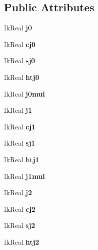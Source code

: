 \subsection*{Public Attributes}
\begin{DoxyCompactItemize}
\item 
Ik\-Real {\bfseries j0}\label{class_i_k_solver_a57f10792b61e342bc910311172b36488}

\item 
Ik\-Real {\bfseries cj0}\label{class_i_k_solver_aa3c0bd74bcf87573ce608d8039408526}

\item 
Ik\-Real {\bfseries sj0}\label{class_i_k_solver_a791e2437d1fc1b568b213b0388f97d0a}

\item 
Ik\-Real {\bfseries htj0}\label{class_i_k_solver_af29aefe604a6957a573f5532a0ae0924}

\item 
Ik\-Real {\bfseries j0mul}\label{class_i_k_solver_a7e5b52eca8716ef85d3e857c5c6a0664}

\item 
Ik\-Real {\bfseries j1}\label{class_i_k_solver_abce606fc49166277524525eadfe47f1a}

\item 
Ik\-Real {\bfseries cj1}\label{class_i_k_solver_a2eff4800151517f5c649cb948bad8326}

\item 
Ik\-Real {\bfseries sj1}\label{class_i_k_solver_a0d7c3270795003a7947ae93ba90b8335}

\item 
Ik\-Real {\bfseries htj1}\label{class_i_k_solver_aa12be6bab85a8ca6c8c74c0cb5e92cf9}

\item 
Ik\-Real {\bfseries j1mul}\label{class_i_k_solver_a8e666ee88199689ecabf3d3457d86bc2}

\item 
Ik\-Real {\bfseries j2}\label{class_i_k_solver_a2059d93255027d204610a6818e5c45a6}

\item 
Ik\-Real {\bfseries cj2}\label{class_i_k_solver_afae239eeaad5f0c027cd4837faa666a0}

\item 
Ik\-Real {\bfseries sj2}\label{class_i_k_solver_adbd68395fd872d5e9a13f3a787c1b0d9}

\item 
Ik\-Real {\bfseries htj2}\label{class_i_k_solver_a33e07730a03291ee56912b371dc8268f}


\end{DoxyCompactItemize}
